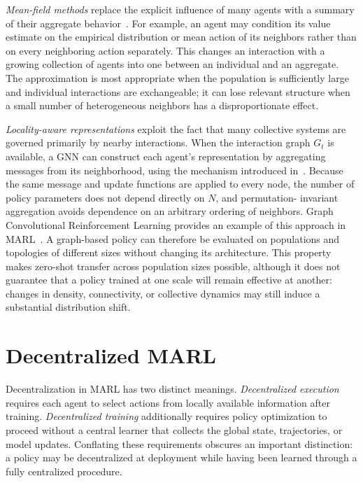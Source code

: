 \emph{Mean-field methods} replace the explicit influence of many agents with a
summary of their aggregate behavior~\cite{DBLP:conf/icml/YangLLZZWY18}.
%
For example, an agent may condition its value estimate on the empirical
distribution or mean action of its neighbors rather than on every neighboring
action separately.
%
This changes an interaction with a growing collection of agents into one between
an individual and an aggregate. The approximation is most appropriate when the
population is sufficiently large and individual interactions are exchangeable;
it can lose relevant structure when a small number of heterogeneous neighbors has
a disproportionate effect.

\emph{Locality-aware representations} exploit the fact that many collective
systems are governed primarily by nearby interactions.
%
When the interaction graph $G_t$ is available, a \gls{GNN} can construct each
agent's representation by aggregating messages from its neighborhood, using the
mechanism introduced in~.
%
Because the same message and update functions are applied to every node, the
number of policy parameters does not depend directly on $N$, and permutation-
invariant aggregation avoids dependence on an arbitrary ordering of neighbors.
Graph Convolutional Reinforcement Learning provides an example of this approach
in MARL~\cite{DBLP:conf/iclr/JiangDHL20}.
%
A graph-based policy can therefore be evaluated on populations and topologies of
different sizes without changing its architecture. This property makes zero-shot
transfer across population sizes possible, although it does not guarantee that a
policy trained at one scale will remain effective at another: changes in density,
connectivity, or collective dynamics may still induce a substantial distribution
shift.

\section{Decentralized MARL}
\label{sec:rl-decentralized}

Decentralization in MARL has two distinct meanings.
%
\emph{Decentralized execution} requires each agent to select actions from locally
available information after training. \emph{Decentralized training} additionally
requires policy optimization to proceed without a central learner that collects
the global state, trajectories, or model updates.
%
Conflating these requirements obscures an important distinction: a policy may be
decentralized at deployment while having been learned through a fully centralized
procedure.


